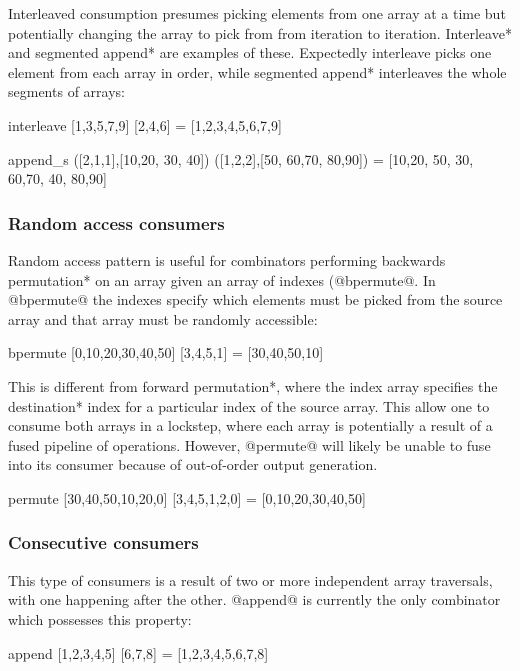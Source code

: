 \documentclass[preamble.tex]{subfiles}
\begin{document}
Interleaved consumption presumes picking elements from one array at a time but potentially changing the array to pick from from iteration to iteration. \*Interleave* and \*segmented append* are examples of these. Expectedly interleave picks one element from each array in order, while \*segmented append* interleaves the whole segments of arrays:

\begin{hscode}
interleave [1,3,5,7,9] [2,4,6] = [1,2,3,4,5,6,7,9]

append_s ([2,1,1],[10,20, 30, 40]) ([1,2,2],[50, 60,70, 80,90])
  = [10,20, 50, 30, 60,70, 40, 80,90]
\end{hscode}


\subsubsection{Random access consumers}

Random access pattern is useful for combinators performing \*backwards permutation* on an array given an array of indexes (@bpermute@. In @bpermute@ the indexes specify which elements must be picked from the source array and that array must be randomly accessible:

\begin{hscode}
bpermute [0,10,20,30,40,50] [3,4,5,1] = [30,40,50,10]
\end{hscode}

This is different from \*forward permutation*, where the index array specifies the \*destination* index for a particular index of the source array. This allow one to consume both arrays in a lockstep, where each array is potentially a result of a fused pipeline of operations. However, @permute@ will likely be unable to fuse into its consumer because of out-of-order output generation.

\begin{hscode}
permute [30,40,50,10,20,0] [3,4,5,1,2,0] = [0,10,20,30,40,50]
\end{hscode}


\subsubsection{Consecutive consumers}

This type of consumers is a result of two or more independent array traversals, with one happening after the other. @append@ is currently the only combinator which possesses this property:

\begin{hscode}
append [1,2,3,4,5] [6,7,8] = [1,2,3,4,5,6,7,8]
\end{hscode}
\end{document}
